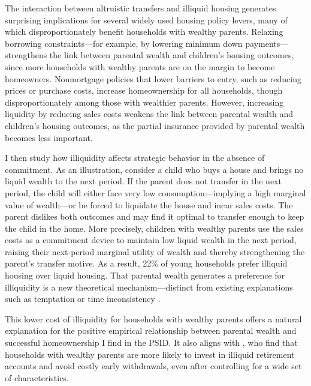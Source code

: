 \documentclass[12pt]{article}
\begin{document}
The interaction between altruistic transfers and illiquid housing generates surprising implications for several widely used housing policy levers, many of which disproportionately benefit households with wealthy parents. Relaxing borrowing constraints---for example, by lowering minimum down payments---strengthens the link between parental wealth and children's housing outcomes, since more households with wealthy parents are on the margin to become homeowners. Nonmortgage policies that lower barriers to entry, such as reducing prices or purchase costs, increase homeownership for all households, though disproportionately among those with wealthier parents. However, increasing liquidity by reducing sales costs weakens the link between parental wealth and children's housing outcomes, as the partial insurance provided by parental wealth becomes less important.

I then study how illiquidity affects strategic behavior in the absence of commitment. As an illustration, consider a child who buys a house and brings no liquid wealth to the next period. If the parent does not transfer in the next period, the child will either face very low consumption—implying a high marginal value of wealth—or be forced to liquidate the house and incur sales costs. The parent dislikes both outcomes and may find it optimal to transfer enough to keep the child in the home. More precisely, children with wealthy parents use the sales costs as a commitment device to maintain low liquid wealth in the next period, raising their next-period marginal utility of wealth and thereby strengthening the parent’s transfer motive. As a result, 22\% of young households prefer illiquid housing over liquid housing. That parental wealth generates a preference for illiquidity is a new theoretical mechanism---distinct from existing explanations such as temptation or time inconsistency \citep[e.g.,][]{attanasio2024temptation,laibson1997golden}.

This lower cost of illiquidity for households with wealthy parents offers a natural explanation for the positive empirical relationship between parental wealth and successful homeownership I find in the PSID. It also aligns with \citet{choukhmane2023benefits}, who find that households with wealthy parents are more likely to invest in illiquid retirement accounts and avoid costly early withdrawals, even after controlling for a wide set of characteristics.
\end{document}
